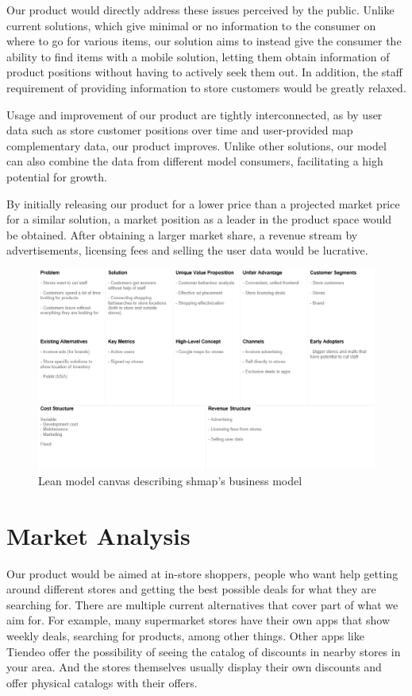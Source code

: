 \documentclass[titlepage]{article}
\def\companyName{shmap}
\begin{document}
Our product would directly address these issues perceived by the public. Unlike current solutions, which give minimal or no information to the consumer on where to go for various items,
our solution aims to instead give the consumer the ability to find items with a mobile solution,
letting them obtain information of product positions without having to actively seek them out.
In addition, the staff requirement of providing information to store customers would be greatly relaxed.

Usage and improvement of our product are tightly interconnected, as by user data such as store customer positions over time 
and user-provided map complementary data, our product improves. 
Unlike other solutions, our model can also combine the data from different model consumers, 
facilitating a high potential for growth.

By initially releasing our product for a lower price than a projected market price for a similar solution,
a market position as a leader in the product space would be obtained.
After obtaining a larger market share, a revenue stream by advertisements, 
licensing fees and selling the user data would be lucrative.

\begin{figure}[ht]
    \centering
    \includegraphics[width=1\textwidth]{lean model canvas.png}
    \caption{Lean model canvas describing \companyName's business model}
    \label{fig:lean-model-canvas}
\end{figure}

\section{Market Analysis}
Our product would be aimed at in-store shoppers, people who want help getting around different stores and getting the best possible deals for what they are searching for. There are multiple current alternatives that cover part of what we aim for. For example, many supermarket stores have their own apps that show weekly deals, searching for products, among other things. Other apps like Tiendeo offer the possibility of seeing the catalog of discounts in nearby stores in your area. And the stores themselves usually display their own discounts and offer physical catalogs with their offers. 
\end{document}
